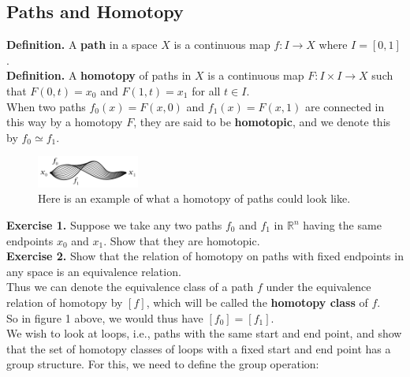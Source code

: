 \documentclass[a4paper]{article}
\theoremstyle{plain}%
\theoremstyle{definition}
\theoremstyle{remark}
\begin{document}
\subsection*{Paths and Homotopy}

\textbf{Definition.} A \textbf{path} in a space $X$ is a continuous map
$f  \colon I \to X$ where $ I = \left[ 0,1 \right] $.\\
\linebreak
\textbf{Definition.} A \textbf{homotopy} of paths in $X$ is a continuous map
$F  \colon I \times I \to X$ such that $F(0,t) = x_0$ and $F(1,t) = x_1$ for
all $t \in I$.\\
When two paths $f_0(x) = F(x,0)$ and $f_1(x) = F(x,1)$ are connected in this way by a homotopy
$F$, they are said to be \textbf{homotopic}, and we denote this
by $f_0 \simeq f_1$.

\begin{figure}[H]
    \centering
    \includegraphics[width=0.3\textwidth]{homotopy.png}
    \caption{Here is an example of what a homotopy of paths could look like.}
    \label{fig:homotopy-png}
\end{figure}

\textbf{Exercise 1.} Suppose we take any two paths
$f_0$ and $f_1$ in $\mathbb{R}^{n}$ having the same endpoints $x_0$ and $x_1$.
Show that they are homotopic.\\
\linebreak
\textbf{Exercise 2.} Show that the relation of homotopy on paths with fixed
endpoints in any space is an equivalence relation.\\
\linebreak
Thus we can denote the equivalence class of a path $f$ under the equivalence
relation of homotopy by $\left[ f \right] $, which will be called the
\textbf{homotopy class} of $f$.\\
So in figure 1 above, we would thus have $\left[ f_0 \right] = \left[ f_1
\right] $.\\
\linebreak
We wish to look at loops, i.e., paths with the same start and end point, and
show that the set of homotopy classes of loops with a fixed start and end point
has a group structure. For this, we need to define the group operation:\\
\end{document}
